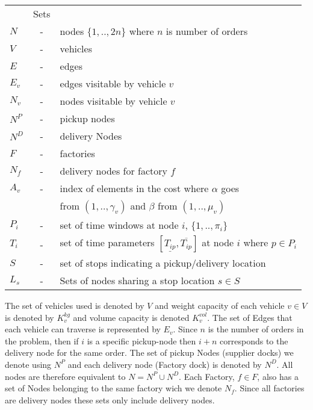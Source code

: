 \documentclass[../main.tex]{subfiles}
\begin{document}
\begin{tabular}{l c l }
              &Sets 					        	\\ 
    $N      $ &-& nodes $\{1,..,2n\}$ where $n$ is number of orders     \\
    $V      $ &-& vehicles  					        \\
    $E      $ &-& edges 					        \\
    $E_v    $ &-& edges visitable by vehicle $v$ 		        \\
    $N_v    $ &-& nodes visitable by vehicle $v$  		        \\
    $N^P    $ &-& pickup nodes 					        \\
    $N^D    $ &-& delivery Nodes 				        \\
    $F      $ &-& factories 					        \\
    $N_f    $ &-& delivery nodes for factory $f$ 		        \\
    $A_v    $ &-& index of elements in the cost where $\alpha$ goes     \\
              & & from $(1,..,\gamma_v)$ and $\beta$ from $(1,..,\mu_v)$\\
    $P_i    $ &-& set of time windows at node $i$, $\{1,..,\pi_i \}$	\\
    $T_{i}  $ &-& set of time parameters $[ \underline{T_{ip}},  
		  \overline{T_{ip}} ]$ at node $i$ where $p \in P_i$	\\
    $S      $ &-& set of stops indicating a pickup/delivery location    \\
    $L_s    $ &-& Sets of nodes sharing a stop location 
                  $s \in S$ 	                                        \\
\end{tabular}
\linebreak
\linebreak
\par
The set of vehicles used is denoted by $V$ and weight capacity of each vehicle $v \in V$ is denoted by $K_v^{kg}$ and volume capacity is denoted $K_v^{vol}$.
The set of Edges that each vehicle can traverse is represented by $E_v$. 
Since $n$ is the number of orders in the problem, then if $i$ is a specific pickup-node then $i+n$ corresponds to the delivery node for the same order.
The set of pickup Nodes (supplier docks) we denote using $N^P$ and each delivery node (Factory dock) is denoted by $N^D$. 
All nodes are therefore equivalent to $N = N^P \cup N^D$. 
Each Factory, $f \in F$, also has a set of Nodes belonging to the same factory wich we denote $N_f$. Since all factories are delivery nodes these sets only include delivery nodes.
\end{document}
